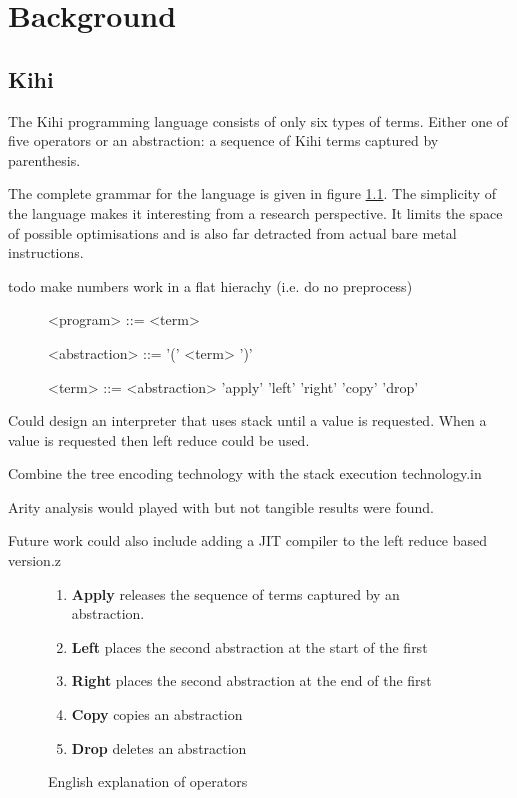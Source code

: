 \chapter{Background} \label{C:background} 

\section{Kihi}
The Kihi programming language consists of only six types of terms. Either
one of five operators or an abstraction: a sequence of Kihi terms
captured by parenthesis. 

The complete grammar for the language is given
in figure \ref{fig:grammar}. The simplicity of the language makes it
interesting from a research perspective. It limits the space of possible
optimisations and is also far detracted from actual bare metal instructions.





todo make numbers work in a flat hierachy  (i.e. do no preprocess)
\begin{figure}[htb]       
    \centering
    \begin{grammar}
    <program> ::= { <term> }

    <abstraction> ::= '(' <term> ')'

    <term> ::= <abstraction>
        \alt 'apply'
        \alt 'left'
        \alt 'right'
        \alt 'copy'
        \alt 'drop'
    
      \end{grammar}
    \caption{}
    \label{fig:grammar}
\end{figure}


Could design an interpreter that uses stack until a value is requested. When a
value is requested then left reduce could be used.

Combine the tree encoding technology with the stack execution technology.in

Arity analysis would played with but not tangible results were found.

Future work could also include adding a JIT compiler to the left reduce based version.z


\begin{figure}
    \centering
    \begin{enumerate}
        \item \textbf{Apply} releases the sequence of terms captured by an abstraction.
        \item \textbf{Left} places the second abstraction at the start of the first
        \item \textbf{Right} places the second abstraction at the end of the first
        \item \textbf{Copy} copies an abstraction
        \item \textbf{Drop} deletes an abstraction
    \end{enumerate}
    \caption{English explanation of operators}
    \label{fig:operator explanation}
\end{figure}

